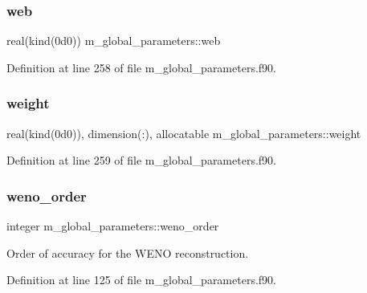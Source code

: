 \mbox{\label{namespacem__global__parameters_af2ed21959a90158c2459574230cdfcff}} 
\subsubsection{\texorpdfstring{web}{web}}
{\footnotesize\ttfamily real(kind(0d0)) m\+\_\+global\+\_\+parameters\+::web}



Definition at line 258 of file m\+\_\+global\+\_\+parameters.\+f90.

\mbox{\label{namespacem__global__parameters_a121ed97f0ae913d37bce5bbf1c7b2cc2}} 
\subsubsection{\texorpdfstring{weight}{weight}}
{\footnotesize\ttfamily real(kind(0d0)), dimension(\+:), allocatable m\+\_\+global\+\_\+parameters\+::weight}



Definition at line 259 of file m\+\_\+global\+\_\+parameters.\+f90.

\mbox{\label{namespacem__global__parameters_ab8488205257dab4e94258eee55d0d1aa}} 
\subsubsection{\texorpdfstring{weno\+\_\+order}{weno\_order}}
{\footnotesize\ttfamily integer m\+\_\+global\+\_\+parameters\+::weno\+\_\+order}



Order of accuracy for the W\+E\+NO reconstruction. 



Definition at line 125 of file m\+\_\+global\+\_\+parameters.\+f90.

